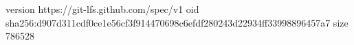 version https://git-lfs.github.com/spec/v1
oid sha256:d907d311cdf0ce1e56cf3f914470698c6efdf280243d22934ff33998896457a7
size 786528
